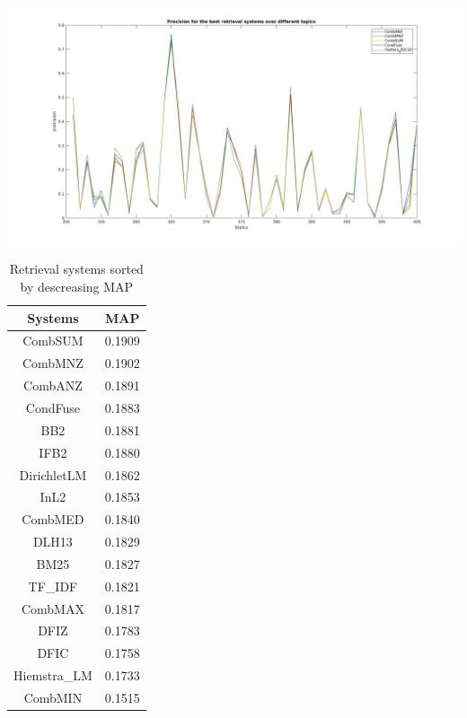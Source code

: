 		\begin{table}[H]
			\begin{minipage}{0.7\linewidth}
				\centering				
				\includegraphics[width=\linewidth]{../eval/results-img-graphs/top5.jpg}
				\label{fig:top5AP}					
			\end{minipage}
		\hfill	
			\begin{minipage}{0.3\linewidth}
				\begin{tabular}{c c}
					\toprule
					\textbf{Systems} & \textbf{MAP}\\ \toprule
					CombSUM & 0.1909 \\
					CombMNZ & 0.1902 \\
					CombANZ & 0.1891 \\
					CondFuse & 0.1883 \\
					BB2 & 0.1881 \\
					IFB2 & 0.1880 \\					
					DirichletLM & 0.1862 \\
					InL2 & 0.1853 \\
					CombMED & 0.1840 \\
					DLH13 & 0.1829 \\				
					BM25 & 0.1827 \\
					TF\_IDF & 0.1821\\
					CombMAX & 0.1817 \\
					DFIZ & 0.1783 \\					
					DFIC & 0.1758 \\				
					Hiemstra\_LM & 0.1733 \\
					CombMIN & 0.1515 \\							
					\bottomrule
				\end{tabular}
			\caption{Retrieval systems sorted by descreasing MAP}
			\label{tab:17SysMAP}
			\end{minipage}			
	\end{table}

